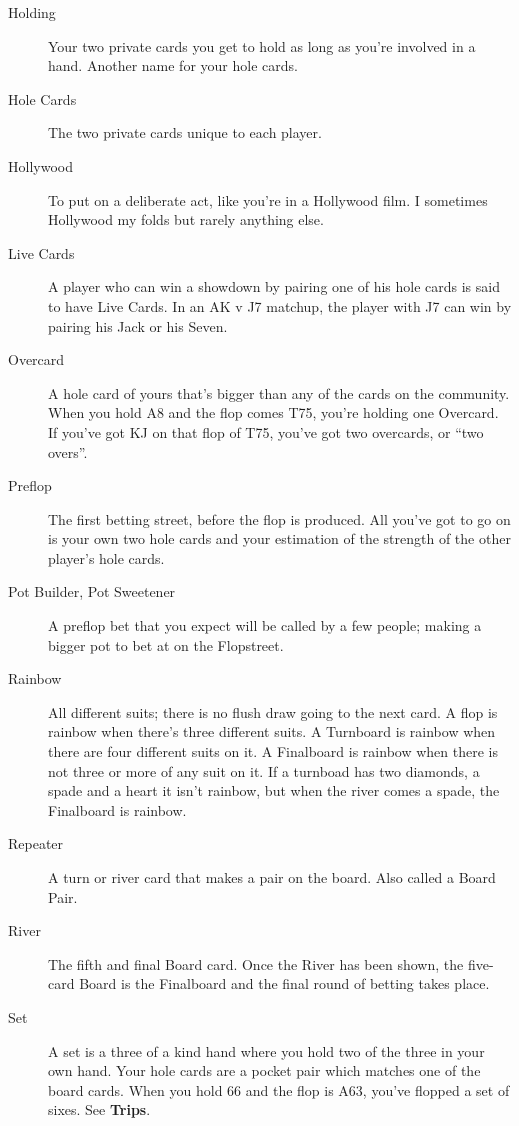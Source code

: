 \begin{description}
\item[Holding] Your two private cards you get to hold as long as
you're involved in a hand. Another name for your hole cards.

\item[Hole Cards] The two private cards unique to each player.

\item[Hollywood] To put on a deliberate act, like you're in a
Hollywood film. I sometimes Hollywood my folds but rarely anything
else.

\item[Live Cards] A player who can win a showdown by pairing one of
his hole cards is said to have Live Cards. In an AK v J7 matchup, the
player with J7 can win by pairing his Jack or his Seven.

\item[Overcard] A hole card of yours that's bigger than any of the
cards on the community. When you hold A8 and the flop comes T75,
you're holding one Overcard. If you've got KJ on that flop of T75,
you've got two overcards, or ``two overs''.

\item[Preflop] The first betting street, before the flop is produced.
All you've got to go on is your own two hole cards and your estimation
of the strength of the other player's hole cards.

\item[Pot Builder, Pot Sweetener] A preflop bet that you expect will
be called by a few people; making a bigger pot to bet at on the
Flopstreet.

\item[Rainbow] All different suits; there is no flush
draw going to the next card. A flop is rainbow when there's three
different suits. A Turnboard is rainbow when there are four different
suits on it. A Finalboard is rainbow when there is not
three or more of any suit on it. If a turnboad has two diamonds, a
spade and a heart it isn't rainbow, but when the river comes a spade,
the Finalboard is rainbow.

\item[Repeater] A turn or river card that makes a pair on the
board. Also called a Board Pair.

\item[River] The fifth and final Board card. Once the River has been
shown, the five-card Board is the Finalboard and the final round of
betting takes place.

\item[Set] A set is a three of a kind hand where you hold two of the
three in your own hand. Your hole cards are a pocket pair which
matches one of the board cards. When you hold 66 and the flop is A63,
you've flopped a set of sixes. See \textbf{Trips}.


\end{description}
